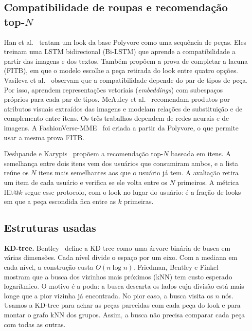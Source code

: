 \subsection{Compatibilidade de roupas e recomendação top-$N$}

Han et al.~\cite{han2017} tratam um look da base Polyvore como uma sequência de peças. Eles treinam uma LSTM bidirecional (Bi-LSTM) que aprende a compatibilidade a partir das imagens e dos textos. Também propõem a prova de completar a lacuna (FITB), em que o modelo escolhe a peça retirada do look entre quatro opções. Vasileva et al.~\cite{vasileva2018} observam que a compatibilidade depende do par de tipos de peça. Por isso, aprendem representações vetoriais (\emph{embeddings}) com subespaços próprios para cada par de tipos. McAuley et al.~\cite{mcauley2015} recomendam produtos por atributos visuais extraídos das imagens e modelam relações de substituição e de complemento entre itens. Os três trabalhos dependem de redes neurais e de imagens. A FashionVerse-MME~\cite{fashionverse} foi criada a partir da Polyvore, o que permite usar a mesma prova FITB.

Deshpande e Karypis~\cite{deshpande2004} propõem a recomendação top-$N$ baseada em itens. A semelhança entre dois itens vem dos usuários que consumiram ambos, e a lista reúne os $N$ itens mais semelhantes aos que o usuário já tem. A avaliação retira um item de cada usuário e verifica se ele volta entre os $N$ primeiros. A métrica Hit@$k$ segue esse protocolo, com o look no lugar do usuário: é a fração de looks em que a peça escondida fica entre as $k$ primeiras.

\subsection{Estruturas usadas}

\textbf{KD-tree.} Bentley~\cite{bentley1975} define a KD-tree como uma árvore binária de busca em várias dimensões. Cada nível divide o espaço por um eixo. Com a mediana em cada nível, a construção custa $O(n \log n)$. Friedman, Bentley e Finkel~\cite{friedman1977} mostram que a busca dos vizinhos mais próximos (kNN) tem custo esperado logarítmico. O motivo é a poda: a busca descarta os lados cuja divisão está mais longe que a pior vizinha já encontrada. No pior caso, a busca visita os $n$ nós. Usamos a KD-tree para achar as peças parecidas com cada peça do look e para montar o grafo kNN dos grupos. Assim, a busca não precisa comparar cada peça com todas as outras.

